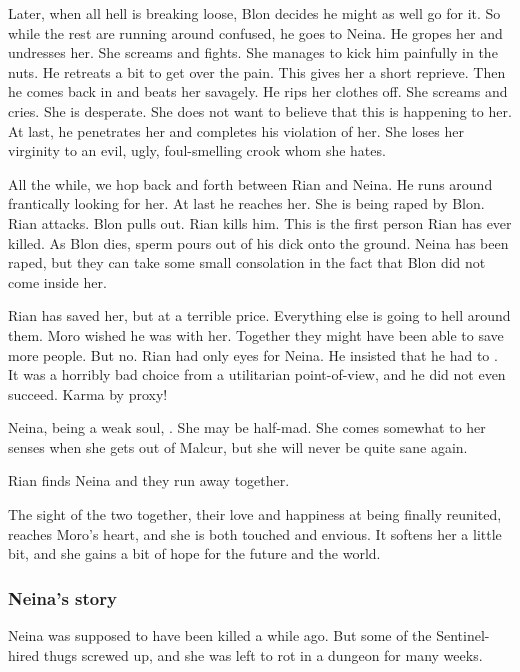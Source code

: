 Later, when all hell is breaking loose, Blon decides he might as well go for it. 
So while the rest are running around confused, he goes to Neina. 
He gropes her and undresses her. 
She screams and fights.
She manages to kick him painfully in the nuts.
He retreats a bit to get over the pain. 
This gives her a short reprieve.
Then he comes back in and beats her savagely. 
He rips her clothes off.
She screams and cries. 
She is desperate. 
She does not want to believe that this is happening to her. 
At last, he penetrates her and completes his violation of her. 
She loses her virginity to an evil, ugly, foul-smelling crook whom she hates. 

All the while, we hop back and forth between Rian and Neina.
He runs around frantically looking for her. 
At last he reaches her.
She is being raped by Blon. 
Rian attacks.
Blon pulls out.
Rian kills him.
This is the first person Rian has ever killed. 
As Blon dies, sperm pours out of his dick onto the ground.
Neina has been raped, but they can take some small consolation in the fact that Blon did not come inside her. 

Rian has saved her, but at a terrible price. 
Everything else is going to hell around them. 
Moro wished he was with her.
Together they might have been able to save more people.
But no.
Rian had only eyes for Neina.
He insisted that he had to .
It was a horribly bad choice from a utilitarian point-of-view, and he did not even succeed. 
Karma by proxy! 

Neina, being a weak soul, .
She may be half-mad. 
She comes somewhat to her senses when she gets out of Malcur, but she will never be quite sane again. 





Rian finds Neina and they run away together. 

The sight of the two together, their love and happiness at being finally reunited, reaches Moro's heart, and she is both touched and envious. It softens her a little bit, and she gains a bit of hope for the future and the world.





\subsubsection{Neina's story}
Neina was supposed to have been killed a while ago. But some of the Sentinel-hired thugs screwed up, and she was left to rot in a dungeon for many weeks. 

